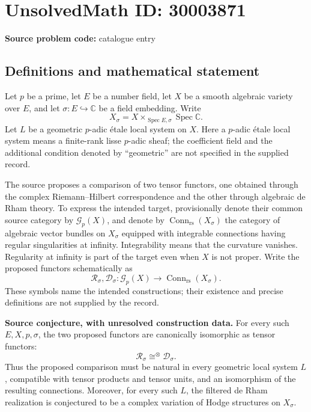 \documentclass[11pt]{article}
\newcommand{\C}{\mathbb{C}}
\begin{document}
\section*{UnsolvedMath ID: 30003871}
\textbf{Source problem code:} catalogue entry
\subsection{Definitions and mathematical statement}
Let \(p\) be a prime, let \(E\) be a number field, let \(X\) be a smooth algebraic variety over \(E\), and let \(\sigma:E\hookrightarrow\C\) be a field embedding. Write
\[
X_\sigma=X\times_{\operatorname{Spec}E,\sigma}\operatorname{Spec}\C.
\]
Let \(L\) be a geometric \(p\)-adic étale local system on \(X\). Here a \(p\)-adic étale local system means a finite-rank lisse \(p\)-adic sheaf; the coefficient field and the additional condition denoted by ``geometric'' are not specified in the supplied record.

The source proposes a comparison of two tensor functors, one obtained through the complex Riemann--Hilbert correspondence and the other through algebraic de Rham theory. To express the intended target, provisionally denote their common source category by \(\mathcal G_p(X)\), and denote by \(\operatorname{Conn}_{\mathrm{rs}}(X_\sigma)\) the category of algebraic vector bundles on \(X_\sigma\) equipped with integrable connections having regular singularities at infinity. Integrability means that the curvature vanishes. Regularity at infinity is part of the target even when \(X\) is not proper. Write the proposed functors schematically as
\[
\mathcal R_\sigma,\mathcal D_\sigma:
\mathcal G_p(X)\longrightarrow\operatorname{Conn}_{\mathrm{rs}}(X_\sigma).
\]
These symbols name the intended constructions; their existence and precise definitions are not supplied by the record.

\textbf{Source conjecture, with unresolved construction data.} For every such \(E,X,p,\sigma\), the two proposed functors are canonically isomorphic as tensor functors:
\[
\mathcal R_\sigma\cong^{\otimes}\mathcal D_\sigma.
\]
Thus the proposed comparison must be natural in every geometric local system \(L\), compatible with tensor products and tensor units, and an isomorphism of the resulting connections. Moreover, for every such \(L\), the filtered de Rham realization is conjectured to be a complex variation of Hodge structures on \(X_\sigma\).
\end{document}
